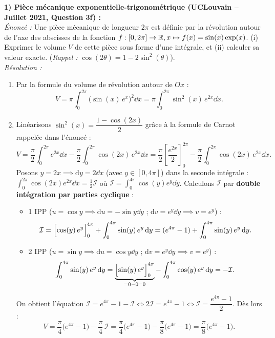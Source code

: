\begin{exemple}
\textbf{1) Pièce mécanique exponentielle-trigonométrique (UCLouvain -- Juillet 2021, Question 3f) :}\\
\emph{Énoncé :} Une pièce mécanique de longueur $2\pi$ est définie par la révolution autour de l'axe des abscisses de la fonction $f : [0, 2\pi] \to \mathbb{R}, x \mapsto f(x) = \sin(x)\exp(x)$.
(i) Exprimer le volume $V$ de cette pièce sous forme d'une intégrale, et (ii) calculer sa valeur exacte. (\emph{Rappel :} $\cos(2\theta) = 1 - 2\sin^2(\theta)$).\\
\emph{Résolution :}
\begin{enumerate}[label=(\roman*)]
    \item Par la formule du volume de révolution autour de $Ox$ :
    \[
        \boxed{V = \pi \int_0^{2\pi} \bigl(\sin(x)\,e^x\bigr)^2\dd x = \pi \int_0^{2\pi} \sin^2(x)\,e^{2x}\dd x}.
    \]
    \item Linéarisons $\sin^2(x) = \dfrac{1 - \cos(2x)}{2}$ grâce à la formule de Carnot rappelée dans l'énoncé :
    \[
        V = \frac{\pi}{2}\int_0^{2\pi} e^{2x}\dd x - \frac{\pi}{2}\int_0^{2\pi} \cos(2x)\,e^{2x}\dd x = \frac{\pi}{2}\left[\frac{e^{2x}}{2}\right]_0^{2\pi} - \frac{\pi}{2}\int_0^{2\pi} \cos(2x)\,e^{2x}\dd x.
    \]
    Posons $y = 2x \implies \mathrm{d}y = 2\dd x$ (avec $y \in [0, 4\pi]$) dans la seconde intégrale : $\int_0^{2\pi} \cos(2x)e^{2x}\dd x = \frac{1}{2}\mathcal{I}$ où $\mathcal{I} = \int_0^{4\pi} \cos(y)e^y\dd y$. Calculons $\mathcal{I}$ par \textbf{double intégration par parties cyclique} :
    \begin{itemize}
        \item 1\iere{} IPP ($u = \cos y \implies \mathrm{d}u = -\sin y\dd y$ ; $\mathrm{d}v = e^y\dd y \implies v = e^y$) :
        \[
            \mathcal{I} = \Bigl[\cos(y)\,e^y\Bigr]_0^{4\pi} + \int_0^{4\pi} \sin(y)\,e^y\,\mathrm{d} y = (e^{4\pi} - 1) + \int_0^{4\pi} \sin(y)\,e^y\,\mathrm{d} y.
        \]
        \item 2\ieme{} IPP ($u = \sin y \implies \mathrm{d}u = \cos y\dd y$ ; $\mathrm{d}v = e^y\dd y \implies v = e^y$) :
        \[
            \int_0^{4\pi} \sin(y)\,e^y\,\mathrm{d} y = \underbrace{\Bigl[\sin(y)\,e^y\Bigr]_0^{4\pi}}_{= 0 - 0 = 0} - \int_0^{4\pi} \cos(y)\,e^y\,\mathrm{d} y = -\mathcal{I}.
        \]
    \end{itemize}
    On obtient l'équation $\mathcal{I} = e^{4\pi} - 1 - \mathcal{I} \iff 2\mathcal{I} = e^{4\pi} - 1 \iff \mathcal{I} = \dfrac{e^{4\pi} - 1}{2}$. Dès lors :
    \[
        V = \frac{\pi}{4}\bigl(e^{4\pi} - 1\bigr) - \frac{\pi}{4}\,\mathcal{I} = \frac{\pi}{4}\bigl(e^{4\pi} - 1\bigr) - \frac{\pi}{8}\bigl(e^{4\pi} - 1\bigr) = \boxed{\frac{\pi}{8}\bigl(e^{4\pi} - 1\bigr)}.
    \]
\end{enumerate}


\end{exemple}
